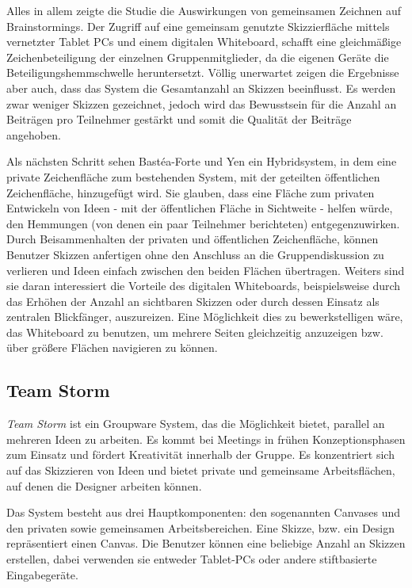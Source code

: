 \medskip Alles in allem zeigte die Studie die Auswirkungen von gemeinsamen Zeichnen auf Brainstormings. Der Zugriff auf eine gemeinsam genutzte Skizzierfläche mittels vernetzter Tablet PCs und einem digitalen Whiteboard, schafft eine gleichmäßige Zeichenbeteiligung der einzelnen Gruppenmitglieder, da die eigenen Geräte die Beteiligungshemmschwelle heruntersetzt. Völlig unerwartet zeigen die Ergebnisse aber auch, dass das System die Gesamtanzahl an Skizzen beeinflusst. Es werden zwar weniger Skizzen gezeichnet, jedoch wird das Bewusstsein für die Anzahl an Beiträgen pro Teilnehmer gestärkt und somit die Qualität der Beiträge angehoben.

\medskip Als nächsten Schritt sehen Bastéa-Forte und Yen ein Hybridsystem, in dem eine private Zeichenfläche zum bestehenden System, mit der geteilten öffentlichen Zeichenfläche, hinzugefügt wird. Sie glauben, dass eine Fläche zum privaten  Entwickeln von Ideen - mit der öffentlichen Fläche in Sichtweite - helfen würde, den Hemmungen (von denen ein paar Teilnehmer berichteten) entgegenzuwirken. Durch Beisammenhalten der privaten und öffentlichen Zeichenfläche, können Benutzer Skizzen anfertigen ohne den Anschluss an die Gruppendiskussion zu verlieren und Ideen einfach zwischen den beiden Flächen übertragen.
Weiters sind sie daran interessiert die Vorteile des digitalen Whiteboards, beispielsweise durch das Erhöhen der Anzahl an sichtbaren Skizzen oder durch dessen Einsatz als zentralen Blickfänger, auszureizen. Eine Möglichkeit dies zu bewerkstelligen wäre, das Whiteboard zu benutzen, um mehrere Seiten gleichzeitig anzuzeigen bzw. über größere Flächen navigieren zu können.

\subsection{Team Storm}
\emph{Team Storm} \citep{Hailpern:2007p113} ist ein Groupware System, das die Möglichkeit bietet, parallel an mehreren Ideen zu arbeiten. Es kommt bei Meetings in frühen Konzeptionsphasen zum Einsatz und fördert Kreativität innerhalb der Gruppe. Es konzentriert sich auf das Skizzieren von Ideen und bietet private und gemeinsame Arbeitsflächen, auf denen die Designer arbeiten können.

Das System besteht aus drei Hauptkomponenten: den sogenannten Canvases und den privaten sowie gemeinsamen Arbeitsbereichen. Eine Skizze, bzw. ein Design repräsentiert einen Canvas. Die Benutzer können eine beliebige Anzahl an Skizzen erstellen, dabei verwenden sie entweder Tablet-PCs oder andere stiftbasierte Eingabegeräte. 


